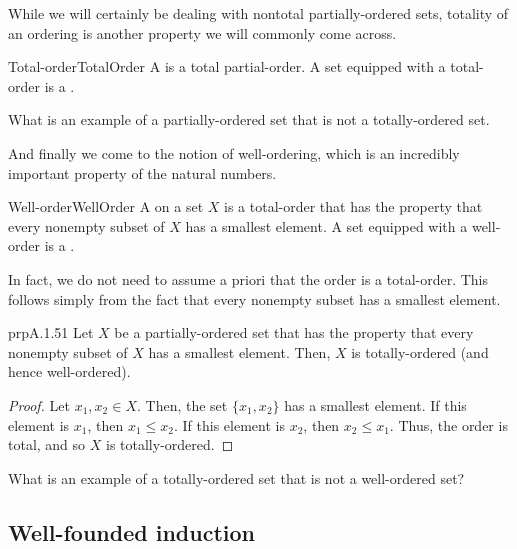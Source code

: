 While we will certainly be dealing with nontotal partially-ordered sets, totality of an ordering is another property we will commonly come across.
\begin{dfn}{Total-order}{TotalOrder}
A  is a total partial-order.  A set equipped with a total-order is a .
\end{dfn}
\begin{exr}{}{}
What is an example of a partially-ordered set that is not a totally-ordered set.
\end{exr}

And finally we come to the notion of well-ordering, which is an incredibly important property of the natural numbers.
\begin{dfn}{Well-order}{WellOrder}
A  on a set $X$ is a total-order that has the property that every nonempty subset of $X$ has a smallest element.  A set equipped with a well-order is a . 
\end{dfn}
In fact, we do not need to assume a priori that the order is a total-order.  This follows simply from the fact that every nonempty subset has a smallest element.
\begin{prp}{}{prpA.1.51}
Let $X$ be a partially-ordered set that has the property that every nonempty subset of $X$ has a smallest element.  Then, $X$ is totally-ordered (and hence well-ordered).
\begin{proof}
Let $x_1,x_2\in X$.  Then, the set $\{ x_1,x_2\}$ has a smallest element.  If this element is $x_1$, then $x_1\leq x_2$.  If this element is $x_2$, then $x_2\leq x_1$.  Thus, the order is total, and so $X$ is totally-ordered.
\end{proof}
\end{prp}
\begin{exr}{}{}
What is an example of a totally-ordered set that is not a well-ordered set?
\end{exr}

\subsection{Well-founded induction}\label{sbsWellFoundedInduction}

